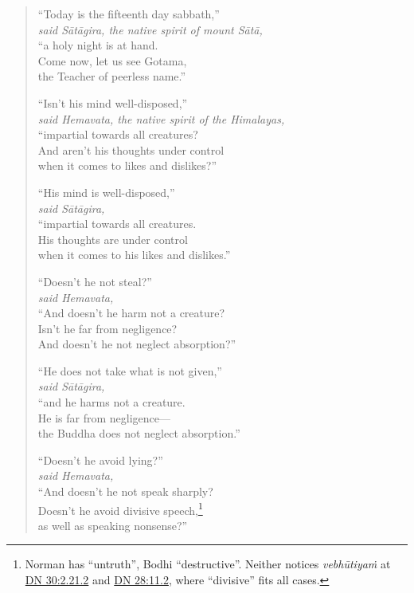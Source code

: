 \documentclass[12pt,openany]{book}%
\newcommand*{\scspeaker}[1]{\hspace{2em}\textit{#1}}
\begin{document}
\begin{verse}%
“Today is the fifteenth day sabbath,” \\
\scspeaker{said \textsanskrit{Sātāgira}, the native spirit of mount \textsanskrit{Sātā}, }\\
“a holy night is at hand. \\
Come now, let us see Gotama, \\
the Teacher of peerless name.” 

“Isn’t his mind well-disposed,” \\
\scspeaker{said Hemavata, the native spirit of the Himalayas, }\\
“impartial towards all creatures? \\
And aren’t his thoughts under control \\
when it comes to likes and dislikes?” 

“His mind is well-disposed,” \\
\scspeaker{said \textsanskrit{Sātāgira}, }\\
“impartial towards all creatures. \\
His thoughts are under control \\
when it comes to his likes and dislikes.” 

“Doesn’t he not steal?” \\
\scspeaker{said Hemavata, }\\
“And doesn’t he harm not a creature? \\
Isn’t he far from negligence? \\
And doesn’t he not neglect absorption?” 

“He does not take what is not given,” \\
\scspeaker{said \textsanskrit{Sātāgira}, }\\
“and he harms not a creature. \\
He is far from negligence—\\
the Buddha does not neglect absorption.” 

“Doesn’t he avoid lying?” \\
\scspeaker{said Hemavata, }\\
“And doesn’t he not speak sharply? \\
Doesn’t he avoid divisive speech,\footnote{Norman has “untruth”, Bodhi “destructive”. Neither notices \textit{\textsanskrit{vebhūtiyaṁ}} at  \href{https://suttacentral.net/dn30/en/sujato\#2.21.2}{DN 30:2.21.2} and \href{https://suttacentral.net/dn28/en/sujato\#11.2}{DN 28:11.2}, where “divisive” fits all cases. } \\
as well as speaking nonsense?” 


\end{verse}
\end{document}
